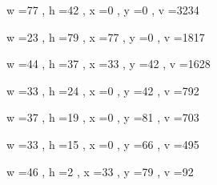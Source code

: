 \documentclass[11pt]{article}
\begin{document}
w =77 , h =42 , x =0 , y =0 , v =3234
\par
w =23 , h =79 , x =77 , y =0 , v =1817
\par
w =44 , h =37 , x =33 , y =42 , v =1628
\par
w =33 , h =24 , x =0 , y =42 , v =792
\par
w =37 , h =19 , x =0 , y =81 , v =703
\par
w =33 , h =15 , x =0 , y =66 , v =495
\par
w =46 , h =2 , x =33 , y =79 , v =92
\par
\newpage
\end{document}
